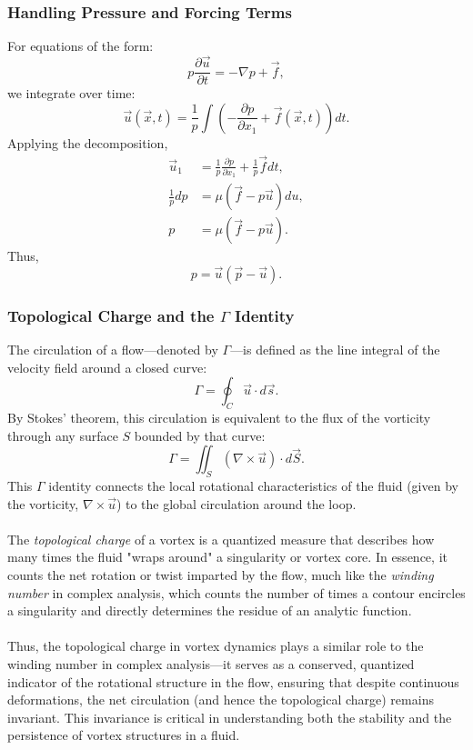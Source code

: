 \documentclass[12pt]{article}
\begin{document}
\subsubsection{Handling Pressure and Forcing Terms}
For equations of the form:
\begin{equation}
    p \frac{\partial \vec{u}}{\partial t} = - \nabla p + \vec{f},
\end{equation}
we integrate over time:
\begin{equation}
    \vec{u}(\vec{x}, t) = \frac{1}{p} \int \left( -\frac{\partial p}{\partial x_1} + \vec{f}(\vec{x}, t) \right) dt.
\end{equation}
Applying the decomposition,
\begin{align}
    \vec{u}_1 &= \frac{1}{p} \frac{\partial p}{\partial x_1} + \frac{1}{p} \vec{f} dt, \\
    \frac{1}{p} dp &= \mu (\vec{f} - p \vec{u}) du, \\
    p &= \mu (\vec{f} - p \vec{u}).
\end{align}
Thus,
\begin{equation}
    p = \vec{u} (\vec{p} - \vec{u}).
\end{equation}

\subsubsection{Topological Charge and the $\Gamma$ Identity }
The circulation of a flow—denoted by $\Gamma$—is defined as the line integral of the velocity field around a closed curve:
\begin{equation}
    \Gamma = \oint_{C} \vec{u} \cdot d\vec{s}.
\end{equation}
By Stokes' theorem, this circulation is equivalent to the flux of the vorticity through any surface $S$ bounded by that curve:
\begin{equation}
    \Gamma = \iint_{S} (\nabla \times \vec{u}) \cdot d\vec{S}.
\end{equation}
This $\Gamma$ identity connects the local rotational characteristics of the fluid (given by the vorticity, $\nabla \times \vec{u}$) to the global circulation around the loop. \\ \\ 
The \textit{topological charge} of a vortex is a quantized measure that describes how many times the fluid "wraps around" a singularity or vortex core. In essence, it counts the net rotation or twist imparted by the flow, much like the \textit{winding number} in complex analysis, which counts the number of times a contour encircles a singularity and directly determines the residue of an analytic function. \\ \\ 
Thus, the topological charge in vortex dynamics plays a similar role to the winding number in complex analysis—it serves as a conserved, quantized indicator of the rotational structure in the flow, ensuring that despite continuous deformations, the net circulation (and hence the topological charge) remains invariant. This invariance is critical in understanding both the stability and the persistence of vortex structures in a fluid.
\end{document}
